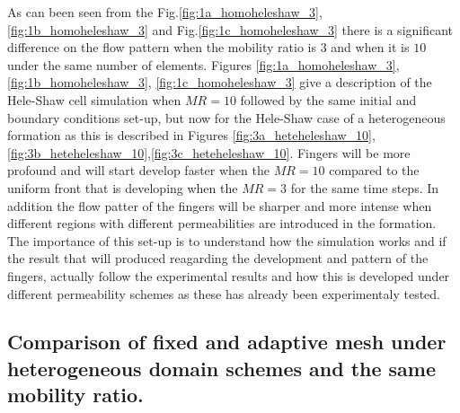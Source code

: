 \documentclass[preprint,authoryear,12pt]{elsarticle}
\begin{document}
\medskip
As can been seen from the Fig.\ref{fig:1a_homoheleshaw_3},\ref{fig:1b_homoheleshaw_3} and Fig.\ref{fig:1c_homoheleshaw_3} there is a significant difference on the flow pattern when the mobility ratio is $3$ and when it is $10$ under the same number of elements. Figures \ref{fig:1a_homoheleshaw_3}, \ref{fig:1b_homoheleshaw_3}, \ref{fig:1c_homoheleshaw_3} give a description of the Hele-Shaw cell simulation when $MR=10$ followed by the same initial and boundary conditions set-up, but now for the Hele-Shaw case of a heterogeneous formation as this is described in Figures \ref{fig:3a_heteheleshaw_10},\ref{fig:3b_heteheleshaw_10},\ref{fig:3c_heteheleshaw_10}. Fingers will be more profound and will start develop faster when the $MR=10$ compared to the uniform front that is developing when the $MR=3$ for the same time steps. In addition the flow patter of the fingers will be sharper and more intense when different regions with different permeabilities are introduced in the formation. The importance of this set-up is to understand how the simulation works and if the result that will produced reagarding the development and pattern of the fingers, actually follow the experimental results  and how this is developed under different permeability schemes as these has already been experimentaly tested.  


\subsection{Comparison of fixed and adaptive mesh under heterogeneous domain schemes and the same mobility ratio.}
\end{document}
